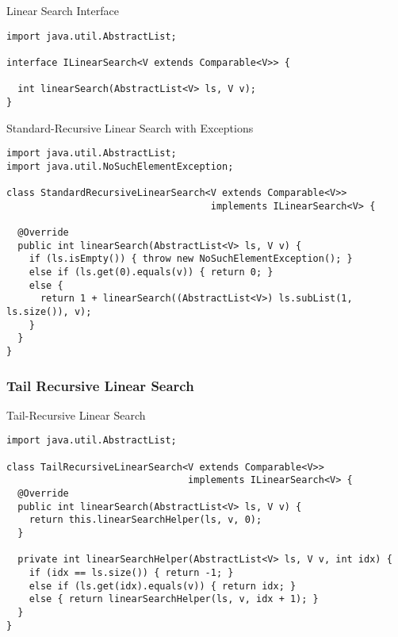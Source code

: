\begin{cl}{Linear Search Interface}
\begin{lstlisting}[language=MyJava]
import java.util.AbstractList;

interface ILinearSearch<V extends Comparable<V>> {
  
  int linearSearch(AbstractList<V> ls, V v);
}
\end{lstlisting}
\end{cl}

\begin{cl}{Standard-Recursive Linear Search with Exceptions}
\begin{lstlisting}[language=MyJava]
import java.util.AbstractList;
import java.util.NoSuchElementException;
  
class StandardRecursiveLinearSearch<V extends Comparable<V>> 
                                    implements ILinearSearch<V> {
  
  @Override
  public int linearSearch(AbstractList<V> ls, V v) {
    if (ls.isEmpty()) { throw new NoSuchElementException(); }
    else if (ls.get(0).equals(v)) { return 0; }
    else { 
      return 1 + linearSearch((AbstractList<V>) ls.subList(1, ls.size()), v); 
    }
  }
}
\end{lstlisting}
\end{cl}

\subsubsection*{Tail Recursive Linear Search}

\begin{cl}{Tail-Recursive Linear Search}
\begin{lstlisting}[language=MyJava]
import java.util.AbstractList;

class TailRecursiveLinearSearch<V extends Comparable<V>> 
                                implements ILinearSearch<V> {
  @Override
  public int linearSearch(AbstractList<V> ls, V v) {
    return this.linearSearchHelper(ls, v, 0);
  }

  private int linearSearchHelper(AbstractList<V> ls, V v, int idx) {
    if (idx == ls.size()) { return -1; }
    else if (ls.get(idx).equals(v)) { return idx; }
    else { return linearSearchHelper(ls, v, idx + 1); }
  }
}
\end{lstlisting}
\end{cl}

